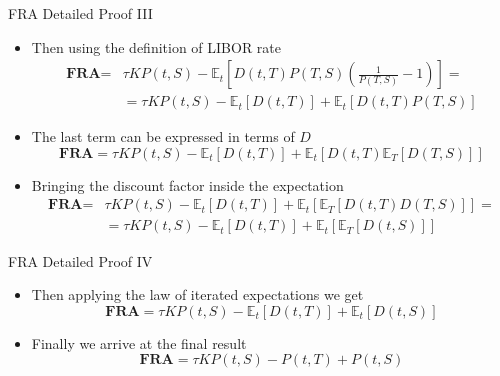 \documentclass{beamer}
\begin{document}
\begin{frame}{FRA Detailed Proof III}
	\begin{itemize}
		\item<1-> Then using the definition of LIBOR rate
		\begin{equation*}
			\begin{aligned}
			\textbf{FRA} = &\tau KP(t,S)-\mathbb{E}_t\left[D(t,T)P(T,S)\left(\frac{1}{P(T,S)}-1\right)\right]= \\
			&=\tau KP(t,S)-\mathbb{E}_t[D(t,T)] + \mathbb{E}_t[D(t,T)P(T,S)]
			\end{aligned}
		\end{equation*}
		\item<2-> The last term can be expressed in terms of $D$
		\begin{equation*}
			\textbf{FRA} = \tau KP(t,S)-\mathbb{E}_t[D(t,T)] + \mathbb{E}_t\left[D(t,T)\mathbb{E}_T[D(T,S)]\right]
		\end{equation*}		
		\item<2-> Bringing the discount factor inside the expectation
		\begin{equation*}
			\begin{aligned}
			\textbf{FRA} = &\tau KP(t,S)-\mathbb{E}_t[D(t,T)] + 				\mathbb{E}_t\left[\mathbb{E}_T[D(t,T)D(T,S)]\right]=\\
			&=\tau KP(t,S)-\mathbb{E}_t[D(t,T)] + 				\mathbb{E}_t\left[\mathbb{E}_T[D(t,S)]\right]
			\end{aligned}
		\end{equation*}		
	\end{itemize}
\end{frame}

\begin{frame}{FRA Detailed Proof IV}
	\begin{itemize}
		\item<1-> Then applying the law of iterated expectations we get
		\begin{equation*}
		\textbf{FRA} = \tau KP(t,S)-\mathbb{E}_t[D(t,T)] + 			\mathbb{E}_t[D(t,S)]
		\end{equation*}
	\item<2-> Finally we arrive at the final result
	\begin{equation*}
	\textbf{FRA} = \tau KP(t,S) - P(t,T) + P(t,S)
	\end{equation*}
	\end{itemize}
\end{frame}
\end{document}
